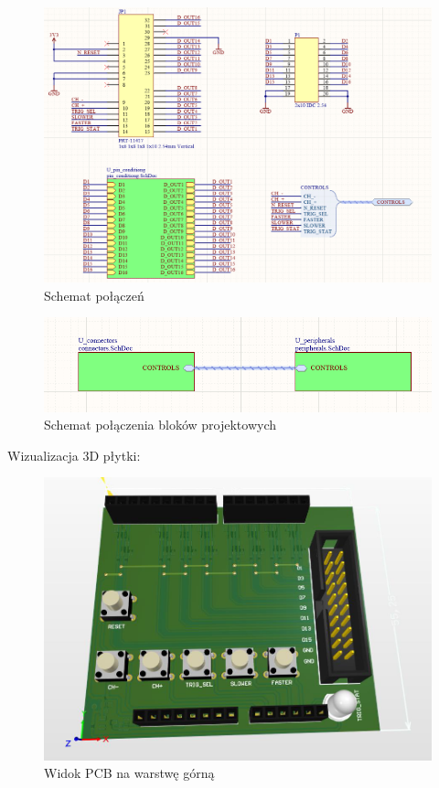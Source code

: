 \begin{figure}[H]
\begin{center}
\includegraphics[width=4.5 in]{images/connectors.png}
\end{center}
\caption{Schemat połączeń}
\label{fig:connectors}
\end{figure}

\begin{figure}[H]
\begin{center}
\includegraphics[width=4 in]{images/top.png}
\end{center}
\caption{Schemat połączenia bloków projektowych}
\label{fig:top}
\end{figure}

Wizualizacja 3D płytki:

\begin{figure}[H]
\begin{center}
\includegraphics[width=4 in]{images/3D_1.png}
\end{center}
\caption{Widok PCB na warstwę górną}
\label{fig:PCB_top}
\end{figure}

